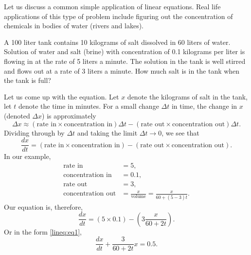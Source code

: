 \begin{example}
Let us discuss a common
simple application of linear equations.
Real life applications of this type of problem include
figuring out the concentration of
chemicals in bodies of water (rivers and lakes).

\begin{mywrapfigsimp}{1.60in}{1.65in}
\noindent
{}
\end{mywrapfigsimp}
A 100 liter tank contains 10 kilograms of salt dissolved in 60 liters of
water.  Solution of water and salt (brine) with concentration of 0.1
kilograms per
liter is flowing in at the rate of 5 liters a minute.  The solution
in the tank is well stirred and flows out at a rate of 3 liters a minute.
How much salt is in the tank when the tank is full?

Let us come up with the equation.  Let $x$ denote the kilograms of salt in the tank,
let $t$ denote the time in minutes.  For a small change $\Delta t$ in
time, the change in $x$ (denoted $\Delta x$) is approximately
\begin{equation*}
\Delta x \approx
(\text{rate in} \times \text{concentration in}) \Delta t - 
(\text{rate out} \times \text{concentration out}) \Delta t .
\end{equation*}
Dividing through by $\Delta t$ and
taking the limit $\Delta t \to 0$, we see that
\begin{equation*}
\frac{dx}{dt} =
(\text{rate in} \times \text{concentration in})  - 
(\text{rate out} \times \text{concentration out}) .
\end{equation*}
In our example,
\begin{equation*}
\begin{aligned}
\text{rate in} &= 5 , \\
\text{concentration in} &= 0.1 , \\
\text{rate out} &= 3 , \\
\text{concentration out} &= \frac{x}{\text{volume}} = \frac{x}{60+(5-3)t} .
\end{aligned}
\end{equation*}
Our equation is, therefore,
\begin{equation*}
\frac{dx}{dt} =
(5 \times 0.1)  - 
\left(3 \frac{x}{60+2t}\right) .
\end{equation*}
Or in the form \eqref{lineq:eq1},
\begin{equation*}
\frac{dx}{dt} +
\frac{3}{60+2t} x
=
0.5 .
\end{equation*}


\end{example}
